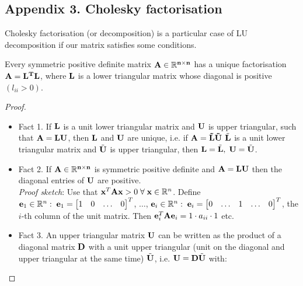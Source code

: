 \documentclass[a4paper]{article}
\numberwithin{equation}{section} %
\newcommand{\setR}{\mathbb{R}} %
\newcommand{\B}[1]{\textbf{\textup{#1}}} %
\begin{document}
\newpage
\subsection{Appendix 3. Cholesky factorisation}
\label{app:cholesky}

Cholesky factorisation (or decomposition) is a particular case of LU decomposition if our matrix satisfies some conditions.
\begin{lemma}
Every symmetric positive definite matrix $\bf{A} \in \setR ^{n \times n}$ has a unique factorisation $\bf{A}=\bf{L}^{T}\bf{L}$, where $\bf{L}$ is a lower triangular matrix whose diagonal is positive $(l_{ii}>0)$. 
\end{lemma}
\begin{proof} \cite{lec_notes_mtsui} \;\quad \\
\begin{itemize}

\item Fact 1.
If $\B{L}$ is a unit lower triangular matrix and $\B{U}$ is upper triangular, such that $\B{A}=\B{LU}$, then $\B{L}$ and $\B{U}$ are unique, i.e. if $\bf{A}=\tilde{\B{L}}\tilde{\B{U}}$ $\tilde{\B{L}}$ is a unit lower triangular matrix and $\tilde{\B{U}}$ is upper triangular, then $\B{L}=\tilde{\B{L}},\; \B{U}=\tilde{\B{U}}$.

\item Fact 2. If $\bf{A} \in \setR ^{n \times n}$ is symmetric positive definite and $\B{A}=\B{LU}$ then the diagonal entries of $\B{U}$ are positive.\\
\textit{Proof sketch}: Use that $\B{x}^{T}\B{Ax}>0\;\forall \; \B{x} \in \setR ^{n }$. Define $\B{e}_1 \in \setR ^{n }:\;\B{e}_1=\begin{bmatrix}1 & 0 & \ldots & 0 \end{bmatrix}^T$, $\ldots$, $\B{e}_i \in \setR ^{n}:\;\B{e}_i=\begin{bmatrix}0 & \ldots & 1 & \ldots & 0 \end{bmatrix}^T$, the $i$-th column of the unit matrix. Then $\B{e}_i^{T}\B{A}\B{e}_{i}=1\cdot a_{ii} \cdot 1$ etc.

\item Fact 3. An upper triangular matrix $\B{U}$ can be written as the product of a diagonal matrix $\B{D}$ with a unit upper triangular (unit on the diagonal and upper triangular at the same time) $\tilde{\B{U}}$, i.e. $\B{U}=\B{D}\tilde{\B{U}}$ with:


\end{itemize}
\end{proof}
\end{document}
